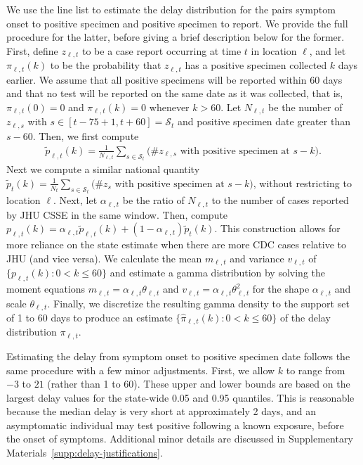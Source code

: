 \documentclass{article}
\begin{document}
We use the line list to estimate the delay distribution for the pairs symptom
onset to positive specimen and positive specimen to report. We provide the full
procedure for the latter, before giving a brief description below for the
former. First, define $z_{\ell,t}$ to be a case report occurring at time $t$ in
location $\ell$, and let $\pi_{\ell,t}(k)$ to be the probability that
$z_{\ell,t}$ has a positive specimen collected $k$ days earlier. We assume that
all positive specimens will be reported within 60 days and that no test will be
reported on the same date as it was collected, that is, $\pi_{\ell,t}(0) = 0$
and $\pi_{\ell,t}(k) = 0$ whenever $k > 60$. Let $N_{\ell,t}$ be the number of
$z_{\ell,s}$ with $s\in[t-75+1,t+60] = \mathcal{S}_t$ and positive specimen date
greater than $s-60$. Then, we first compute
\begin{align*}
    \tilde{p}_{\ell,t}(k) = \frac{1}{N_{\ell,t}}\sum_{s \in \mathcal{S}_t}
    \big(\textrm{\# $z_{\ell,s}$ with positive specimen at $s-k$}\big).
\end{align*}
Next we compute a similar national quantity $\tilde{p}_{t}(k) =
\frac{1}{N_{t}}\sum_{s \in \mathcal{S}_t} \big(\textrm{\# $z_{s}$ with positive
specimen at $s-k$}\big)$, without restricting to location $\ell$. Next, let
$\alpha_{\ell,t}$ be the ratio of $N_{\ell,t}$ to the number of cases reported
by JHU CSSE\cite{dong2020interactive} in the same window. Then, compute
$p_{\ell,t}(k) = \alpha_{\ell,t}\tilde{p}_{\ell,t}(k) +
(1-\alpha_{\ell,t})\tilde{p}_t(k)$. This construction allows for more reliance
on the state estimate when there are more CDC cases relative to JHU (and vice
versa). We calculate the mean $m_{\ell,t}$ and variance $v_{\ell,t}$ of
$\{p_{\ell,t}(k) : 0<k\leq 60\}$ and estimate a gamma distribution by solving
the moment equations $m_{\ell,t} = \alpha_{\ell,t}\theta_{\ell,t}$ and
$v_{\ell,t}= \alpha_{\ell,t}\theta_{\ell,t}^2$ for the shape $\alpha_{\ell,t}$
and scale $\theta_{\ell,t}$. Finally, we discretize the resulting gamma density
to the support set of 1 to 60 days to produce an estimate
$\{\widehat{\pi}_{\ell,t}(k): 0 < k \leq 60\}$ of the delay distribution
$\pi_{\ell,t}$.
 
Estimating the delay from symptom onset to positive specimen date follows the
same procedure with a few minor adjustments. First, we allow $k$ to range from
$-3$ to $21$ (rather than 1 to 60). These upper and lower bounds are based on
the largest delay values for the state-wide 0.05 and 0.95 quantiles. This is
reasonable because the median delay is very short at approximately 2 days, and
an asymptomatic individual may test positive following a known exposure, before
the onset of symptoms. Additional minor details are discussed in
Supplementary Materials~\ref{supp:delay-justifications}.
\end{document}
